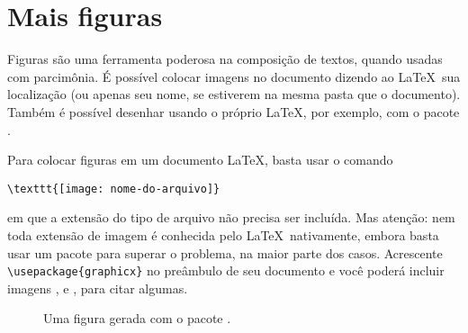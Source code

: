 \section{Mais figuras}

Figuras são uma ferramenta poderosa na composição de textos, quando
usadas com parcimônia. É possível colocar imagens no documento dizendo
ao \LaTeX\ sua localização (ou apenas seu nome, se estiverem na mesma
pasta que o documento). Também é possível desenhar usando o próprio
\LaTeX, por exemplo, com o pacote .

Para colocar figuras em um documento \LaTeX, basta usar o comando
\begin{center}
\verb!\texttt{[image: nome-do-arquivo]}!
\end{center}
em que a extensão do tipo de arquivo não precisa ser incluída. Mas
atenção: nem toda extensão de imagem é conhecida pelo
\LaTeX\ nativamente, embora basta usar um pacote para superar o
problema, na maior parte dos casos. Acrescente
\verb!\usepackage{graphicx}! no preâmbulo de seu documento e você
poderá incluir imagens ,  e
, para citar algumas.

\begin{figure}
  \begin{center}
    
    \caption{Uma figura gerada com o pacote .}
  \end{center}
\end{figure}

